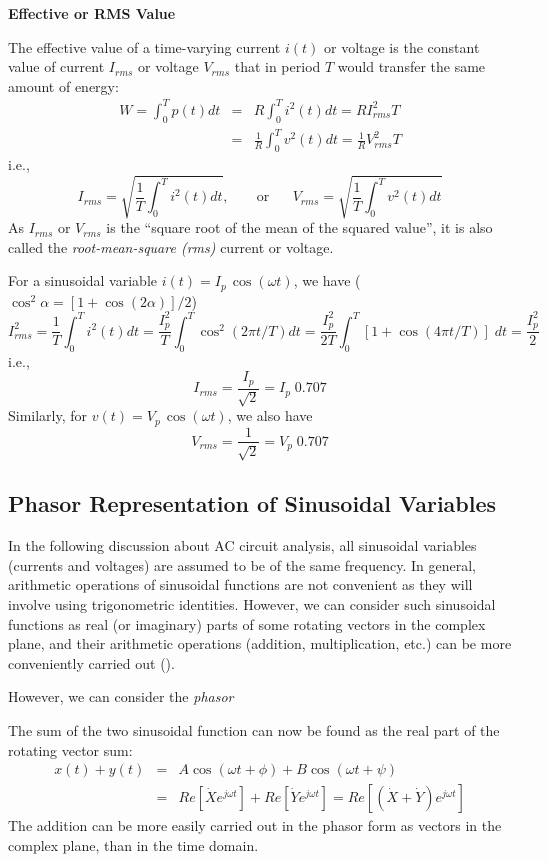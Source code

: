 {\bf Effective or RMS Value}

The effective value of a time-varying current $i(t)$ or voltage is the 
constant value of current $I_{rms}$ or voltage $V_{rms}$ that in period $T$ 
would transfer the same amount of energy:
\begin{eqnarray}
  W=\int_0^T p(t) dt&=&R\int_0^T i^2(t) dt
  =R I^2_{rms}T
  \nonumber \\
  &=&\frac{1}{R}\int_0^T v^2(t) dt=\frac{1}{R}V^2_{rms}T
  \nonumber
\end{eqnarray}
i.e.,
\[ 
I_{rms}=\sqrt{\frac{1}{T}\int_0^T i^2(t) dt},\;\;\;\;\;\;\;\mbox{or}\;\;\;\;\;\;
V_{rms}=\sqrt{\frac{1}{T}\int_0^T v^2(t) dt}	
\]
As $I_{rms}$ or $V_{rms}$ is the ``square root of the mean of the squared value'',
it is also called the {\em root-mean-square (rms)} current or voltage.

For a sinusoidal variable $i(t)=I_p\,\cos(\omega t)$, we have
($\cos^2\alpha=[1+\cos(2\alpha)]/2$) 
\[ 
I^2_{rms} = \frac{1}{T}\int_0^T i^2(t) dt
= \frac{I^2_p}{T}\int_0^T \cos^2(2\pi t/T) dt
= \frac{I^2_p}{2T}\int_0^T [1+\cos(4\pi t/T)]\; dt=\frac{I^2_p}{2} 
\]
i.e.,
\[
I_{rms}=\frac{I_p}{\sqrt{2}}=I_p\;0.707
\]
Similarly, for $v(t)=V_p\,\cos(\omega t)$, we also have 
\[
V_{rms}=\frac{1}{\sqrt{2}}=V_p\;0.707
\]

\subsection*{Phasor Representation of Sinusoidal Variables}

In the following discussion about AC circuit analysis, all sinusoidal
variables (currents and voltages) are assumed to be of the same 
frequency. In general, arithmetic operations of sinusoidal functions 
are not convenient as they will involve using trigonometric identities.
However, we can consider such sinusoidal functions as real (or imaginary)
parts of some rotating vectors in the complex plane, and their arithmetic
operations (addition, multiplication, etc.) can be more conveniently
carried out ().

However, we can consider the {\em phasor} 


The sum of the two sinusoidal function can now be found as the real part of
the rotating vector sum:
\begin{eqnarray}
  x(t)+y(t)&=&A\cos(\omega t+\phi)+B\cos(\omega t+\psi)
  \nonumber\\
  &=&Re[\dot{X}e^{j\omega t}]+Re[\dot{Y}e^{j\omega t}]
  =Re[(\dot{X}+\dot{Y})e^{j\omega t}]
  \nonumber
\end{eqnarray}
The addition can be more easily carried out in the phasor form as vectors 
in the complex plane, than in the time domain.

